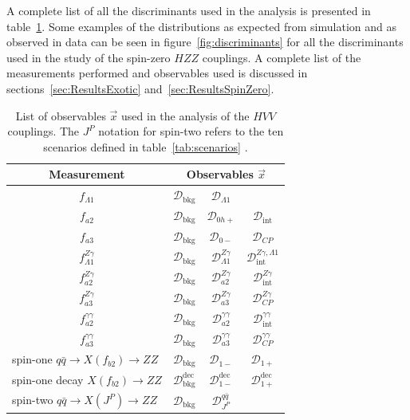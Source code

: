 A complete list of all the discriminants used in the analysis is presented in table~\ref{tab:kdlist}.
Some examples of the distributions as expected from simulation and as observed in data can be seen
in figure~\ref{fig:discriminants} for all the discriminants used in the study of the spin-zero $HZZ$ couplings.
A complete list of the measurements performed and observables used is discussed in sections~\ref{sec:ResultsExotic}
and~\ref{sec:ResultsSpinZero}.

\begin{table}
\centering
\caption[List of observables $\vec{x}$ used in the analysis of the $HVV$ couplings.
The $J^P$ notation for spin-two refers to the ten scenarios defined in table~\ref{tab:scenarios}.
]{
List of observables $\vec{x}$ used in the analysis of the $HVV$ couplings.
The $J^P$ notation for spin-two refers to the ten scenarios defined in table~\ref{tab:scenarios} \cite{Khachatryan:2014kca}.
}
\label{tab:kdlist}
\begin{tabular}{cccc}
 Measurement  & \multicolumn{3}{c}{Observables $\vec{x}$} \\
\hline
 $f_{\Lambda1}$ & $\mathcal{D}_\text{bkg}$ & $\mathcal{D}_{\Lambda1}$ & \\
 $f_{a2}$ &  $\mathcal{D}_\text{bkg}$ & $\mathcal{D}_{0h+}$ & $\mathcal{D}_\text{int}$ \\
  $f_{a3}$ &  $\mathcal{D}_\text{bkg}$ & $\mathcal{D}_{0-}$ & $\mathcal{D}_{C\!P}$ \\
  $f_{\Lambda1}^{Z\gamma}$ &  $\mathcal{D}_\text{bkg}$ & $\mathcal{D}^{Z\gamma}_{\Lambda1}$  & $\mathcal{D}^{Z\gamma,\Lambda1}_\text{int}$  \\
  $f_{a2}^{Z\gamma}$ &  $\mathcal{D}_\text{bkg}$ & $\mathcal{D}^{Z\gamma}_{a2}$  & $\mathcal{D}_\text{int}^{Z\gamma}$ \\
  $f_{a3}^{Z\gamma}$ &  $\mathcal{D}_\text{bkg}$ & $\mathcal{D}^{Z\gamma}_{a3}$  & $\mathcal{D}_{C\!P}^{Z\gamma}$ \\
 $f_{a2}^{\gamma\gamma}$  &  $\mathcal{D}_\text{bkg}$ & $\mathcal{D}^{\gamma\gamma}_{a2}$  & $\mathcal{D}_\text{int}^{\gamma\gamma}$ \\
  $f_{a3}^{\gamma\gamma}$ & $\mathcal{D}_\text{bkg}$ & $\mathcal{D}^{\gamma\gamma}_{a3}$ & $\mathcal{D}_{C\!P}^{\gamma\gamma}$ \\
 \multicolumn{1}{l}{spin-one $q\bar{q}\to X (f_{b2})\to ZZ$} &  $\mathcal{D}_\text{bkg}$ & $\mathcal{D}_{1-}$ & $\mathcal{D}_{1+}$ \\

 \multicolumn{1}{l}{spin-one decay  $X(f_{b2})\to ZZ$} &  $\mathcal{D}_\text{bkg}^\text{dec}$ & $\mathcal{D}_{1-}^\text{dec}$ & $\mathcal{D}_{1+}^\text{dec}$ \\
 \multicolumn{1}{l}{spin-two $q\bar{q}\to X (J^P)\to ZZ$} &  $\mathcal{D}_\text{bkg}$ & $\mathcal{D}_{J^P}^{q\bar{q}}$ & \\


\end{tabular}
\end{table}
